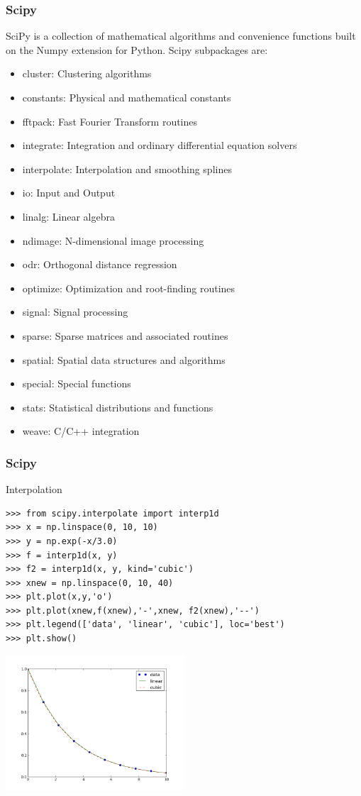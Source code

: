 \begin{frame}
\frametitle{Scipy}
SciPy is a collection of mathematical algorithms and convenience functions built
on the Numpy extension for Python. Scipy subpackages are:
\begin{itemize}
  \item cluster: Clustering algorithms
  \item constants: Physical and mathematical constants
  \item fftpack: Fast Fourier Transform routines
  \item integrate: Integration and ordinary differential equation solvers
  \item interpolate: Interpolation and smoothing splines
  \item io: Input and Output
  \item linalg: Linear algebra
  \item ndimage: N-dimensional image processing
  \item odr: Orthogonal distance regression
  \item optimize: Optimization and root-finding routines
  \item signal: Signal processing
  \item sparse: Sparse matrices and associated routines
  \item spatial: Spatial data structures and algorithms
  \item special: Special functions
  \item stats: Statistical distributions and functions
  \item weave: C/C++ integration               
\end{itemize}
\end{frame}

\begin{frame}[fragile]
\frametitle{Scipy}
Interpolation
\begin{myColorBox}{1.0}{}
\begin{verbatim}
>>> from scipy.interpolate import interp1d
>>> x = np.linspace(0, 10, 10)
>>> y = np.exp(-x/3.0)
>>> f = interp1d(x, y)
>>> f2 = interp1d(x, y, kind='cubic')
>>> xnew = np.linspace(0, 10, 40)
>>> plt.plot(x,y,'o')
>>> plt.plot(xnew,f(xnew),'-',xnew, f2(xnew),'--')
>>> plt.legend(['data', 'linear', 'cubic'], loc='best')
>>> plt.show()
\end{verbatim}
\end{myColorBox}
\pause
\begin{center}
      \includegraphics[width=0.5\textwidth]{pix/interpolation_example_1}
\end{center}
\end{frame}

